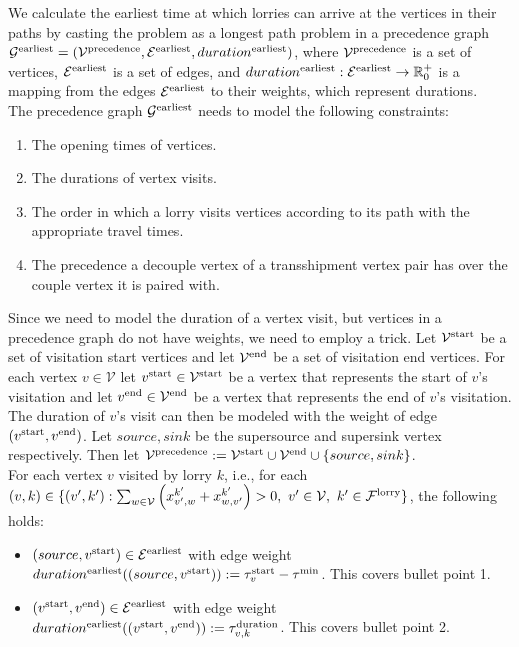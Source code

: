 We calculate the earliest time at which lorries can arrive at the vertices in their paths by casting the problem as a longest path problem in a precedence graph
$\mathcal G^{\rm earliest} = (\mathcal V^{\rm precedence},\mathcal E^{\rm earliest} , duration^{\rm earliest})$, where
$\mathcal V^{\rm precedence}$
is a set of vertices,
$\mathcal E^{\rm earliest}$
is a set of edges, and
$duration^{\rm earliest}:\mathcal E^{\rm earliest} \rightarrow \mathbb R^+_0$
is a mapping from
the edges  $\mathcal E^{\rm earliest}$ to their weights, which represent durations. \\


The precedence graph
$\mathcal G^{\rm earliest} $
needs to model the following constraints:
\begin{enumerate}
  \item The opening times of vertices.
  \item The durations of vertex visits.
  \item The order in which a lorry visits vertices according to its path with the appropriate travel times.
  \item The precedence a decouple vertex of a transshipment vertex pair has over the couple vertex it is paired with.
\end{enumerate}


Since we need to model the duration of a vertex visit, but vertices in a precedence graph do not have weights, we need to employ a trick.
Let
$\mathcal V^{\rm start} $
be a set of visitation start vertices
and let 
$\mathcal V^{\rm end}$
be a set of visitation end vertices.
For each vertex $v \in \mathcal V$ let
$v^{\rm start} \in \mathcal V^{\rm start}$
be a vertex that represents the start of $v$'s  visitation
and let
$v^{\rm end} \in \mathcal V^{\rm end}$
be a vertex that represents the end of $v$'s  visitation.
The duration of $v$'s visit can then be modeled with the weight of edge
$(v^{\rm start},v^{\rm end})$.
Let
$source,sink $
be the supersource and supersink vertex respectively.
Then let
$\mathcal V^{\rm precedence} :=
\mathcal V^{\rm start}
\cup
\mathcal V^{\rm end}
\cup
\{source,sink\}$.\\


For each vertex $v$ visited by lorry $k$, i.e., for each
 $(v,k) \in  \{ (v',k') :
\sum_{w \in \mathcal V}
\left( 
x^{k'}_{v',w} + x^{k'}_{w,v'} 
\right) 
> 0,
\ v' \in \mathcal V,
\ k' \in \mathcal F^{\rm lorry} \}$,
the following holds:
\begin{itemize}
  \item
  $(source,v^{\rm start})  \in \mathcal E^{\rm earliest} $
  with edge weight
    $duration^{\rm earliest}((source,v^{\rm start})) := \tau^{\rm start}_v - \tau^{\rm min} $.
    This covers bullet point 1.
  \item
  $(v^{\rm start},v^{\rm end}) \in \mathcal E^{\rm earliest}$
  with edge weight
  $duration^{\rm earliest}((v^{\rm start},v^{\rm end})) := \tau^{\rm duration}_{v,k}$.
  This covers bullet point 2.
\end{itemize}

